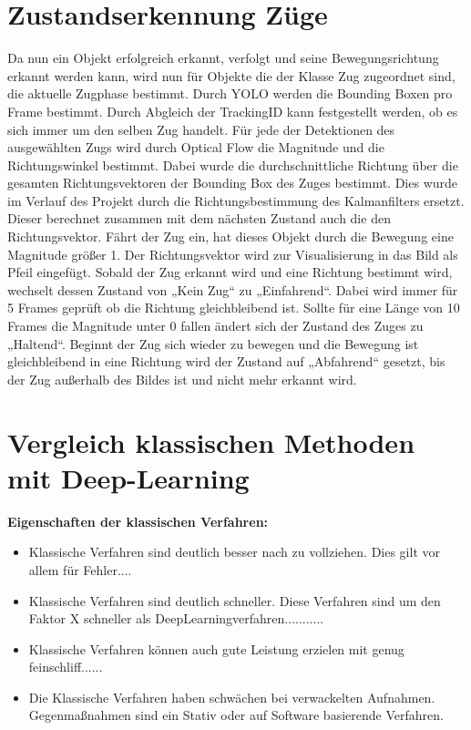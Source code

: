 \documentclass[conference]{IEEEtran}
\begin{document}
	\section{Zustandserkennung Züge}
	Da nun ein Objekt erfolgreich erkannt, verfolgt und seine Bewegungsrichtung erkannt werden kann, wird nun für Objekte die der Klasse Zug zugeordnet sind, die aktuelle Zugphase bestimmt.  
	Durch YOLO werden die Bounding Boxen pro Frame bestimmt. Durch Abgleich der TrackingID kann festgestellt werden, ob es sich immer um den selben Zug handelt. Für jede der Detektionen des ausgewählten Zugs wird durch Optical Flow die Magnitude und die Richtungswinkel bestimmt. Dabei wurde die durchschnittliche Richtung über die gesamten Richtungsvektoren der Bounding Box des Zuges bestimmt. Dies wurde im Verlauf des Projekt durch die Richtungsbestimmung des Kalmanfilters ersetzt. Dieser berechnet zusammen mit dem nächsten Zustand auch die den Richtungsvektor. Fährt der Zug ein, hat dieses Objekt durch die Bewegung eine Magnitude größer 1. Der Richtungsvektor wird zur Visualisierung in das Bild als Pfeil eingefügt. Sobald der Zug erkannt wird und eine Richtung bestimmt wird, wechselt dessen Zustand von „Kein Zug“ zu „Einfahrend“. Dabei wird immer für 5 Frames geprüft ob die Richtung gleichbleibend ist. Sollte für eine Länge von 10 Frames die Magnitude unter 0 fallen ändert sich der Zustand des Zuges zu „Haltend“. Beginnt der Zug sich wieder zu bewegen und die Bewegung ist gleichbleibend in eine Richtung wird der Zustand auf „Abfahrend“ gesetzt, bis der Zug außerhalb des Bildes ist und nicht mehr erkannt wird.
	
	
	
	\section{Vergleich klassischen Methoden mit Deep-Learning}
	\textbf{Eigenschaften der klassischen Verfahren:}
	\begin{itemize}
		\item Klassische Verfahren sind deutlich besser nach zu vollziehen. Dies gilt vor allem für Fehler....
		
		\item Klassische Verfahren sind deutlich schneller. Diese Verfahren sind um den Faktor X schneller als DeepLearningverfahren...........
		
		\item Klassische Verfahren können auch gute Leistung erzielen mit genug feinschliff......
		
		\item Die Klassische Verfahren haben schwächen bei verwackelten Aufnahmen. Gegenmaßnahmen sind ein Stativ oder auf Software basierende Verfahren.
	\end{itemize}
	
\end{document}
